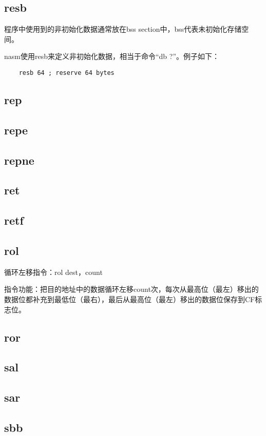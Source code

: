 \documentclass[a4paper,left=2.5cm,right=2.5cm,11pt]{article}
\begin{document}
\subsection{resb}
	程序中使用到的非初始化数据通常放在bss section中，bss代表未初始化存储空间。\par

	nasm使用resb来定义非初始化数据，相当于命令“db ?”。例子如下：
	\begin{lstlisting}
	resb 64 ; reserve 64 bytes
	\end{lstlisting}

\subsection{rep}
\subsection{repe}
\subsection{repne}
\subsection{ret}
\subsection{retf}
\subsection{rol}
	循环左移指令：rol dest，count\par

	指令功能：把目的地址中的数据循环左移count次，每次从最高位（最左）移出的数据位都补充到最低位（最右），最后从最高位（最左）移出的数据位保存到CF标志位。

\subsection{ror}
\subsection{sal}
\subsection{sar}
\subsection{sbb}
\end{document}
